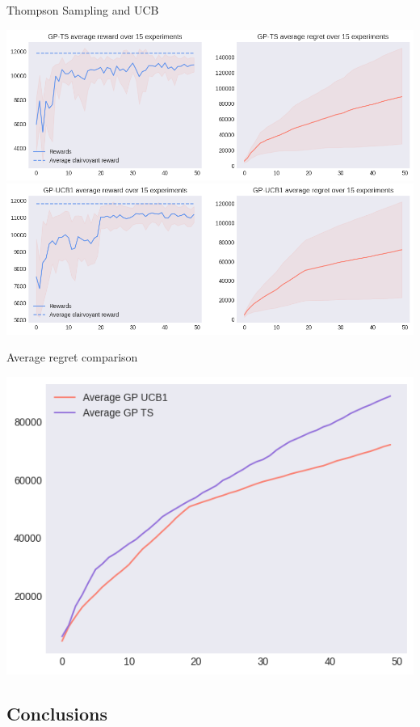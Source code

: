 Thompson Sampling and UCB

\begin{center}
	\includegraphics[scale=0.5]{img/Graphs/uncertain_alpha_unit/image4.png}
	\includegraphics[scale=0.5]{img/Graphs/uncertain_alpha_unit/image5.png}
\end{center}

Average regret comparison

\begin{center}
	\includegraphics[scale=0.5]{img/Graphs/uncertain_alpha_unit/image6.png}
\end{center}

\subsection{Conclusions}

